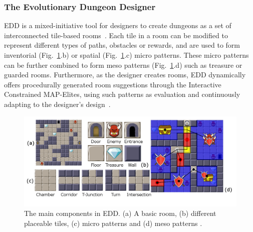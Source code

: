 \subsubsection{The Evolutionary Dungeon Designer}
EDD is a mixed-initiative tool for designers to create dungeons as a set of interconnected tile-based rooms~. Each tile in a room can be modified to represent different types of paths, obstacles or rewards, and are used to form inventorial (Fig.~\ref{fig:tiles}.b) or spatial (Fig.~\ref{fig:tiles}.c) micro patterns. These micro patterns can be further combined to form meso patterns (Fig.~\ref{fig:tiles}.d) such as treasure or guarded rooms. Furthermore, as the designer creates rooms, EDD dynamically offers procedurally generated room suggestions through the Interactive Constrained MAP-Elites, using such patterns as evaluation and continuously adapting to the designer's design~.

\begin{figure}[]
  \centering
  \includegraphics[width=\columnwidth]{included-papers-tex/paper-7/figures/figure1.png}
  \caption{The main components in EDD. (a) A basic room, (b) different placeable tiles, (c) micro patterns and (d) meso patterns .}
  \label{fig:tiles}
\end{figure}


